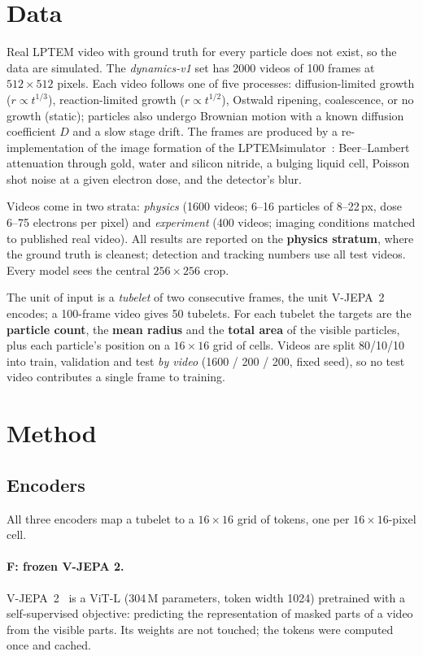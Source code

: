 \documentclass[11pt,a4paper]{article}
\newcommand{\F}{\textsf{F}}
\begin{document}
\section{Data}

Real LPTEM video with ground truth for every particle does not exist, so the data are
simulated. The \emph{dynamics-v1} set has 2000 videos of 100 frames at
$512\times512$ pixels. Each video follows one of five processes: diffusion-limited
growth ($r\propto t^{1/3}$), reaction-limited growth ($r\propto t^{1/2}$), Ostwald
ripening, coalescence, or no growth (static); particles also undergo Brownian motion with
a known diffusion coefficient $D$ and a slow stage drift. The frames are produced by a
re-implementation of the image formation of the LPTEMsimulator~\cite{lptemsim}:
Beer--Lambert attenuation through gold, water and silicon nitride, a bulging liquid
cell, Poisson shot noise at a given electron dose, and the detector's blur.

Videos come in two strata: \emph{physics} (1600 videos; 6--16 particles of 8--22\,px, dose 6--75 electrons per pixel) and \emph{experiment} (400 videos; imaging
conditions matched to published real video). All results are reported on the
\textbf{physics stratum}, where the ground truth is cleanest; detection and tracking
numbers use all test videos. Every model sees the central $256\times256$ crop.

The unit of input is a \emph{tubelet} of two consecutive frames, the unit V-JEPA~2
encodes; a 100-frame video gives 50 tubelets. For each tubelet the targets are the
\textbf{particle count}, the \textbf{mean radius} and the \textbf{total area} of the
visible particles, plus each particle's position on a $16\times16$ grid of cells.
Videos are split 80/10/10 into train, validation and test \emph{by video} (1600 / 200 /
200, fixed seed), so no test video contributes a single frame to training.

\section{Method}

\subsection{Encoders}

All three encoders map a tubelet to a $16\times16$ grid of tokens, one per
$16\times16$-pixel cell.

\paragraph{\F{}: frozen V-JEPA 2.} V-JEPA~2~\cite{assran2025vjepa2} is a ViT-L
(304\,M parameters, token width 1024) pretrained with a self-supervised objective:
predicting the representation of masked parts of a video from the visible parts. Its
weights are not touched; the tokens were computed once and cached.
\end{document}
